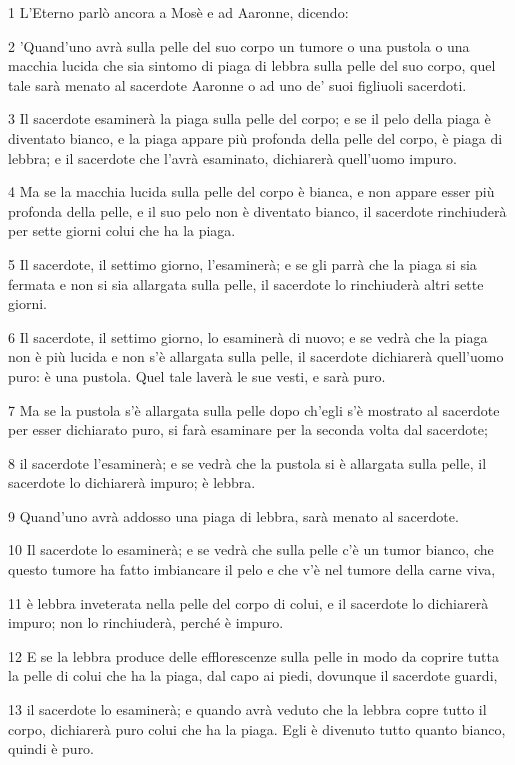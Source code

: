 \par 1 L'Eterno parlò ancora a Mosè e ad Aaronne, dicendo:
\par 2 'Quand'uno avrà sulla pelle del suo corpo un tumore o una pustola o una macchia lucida che sia sintomo di piaga di lebbra sulla pelle del suo corpo, quel tale sarà menato al sacerdote Aaronne o ad uno de' suoi figliuoli sacerdoti.
\par 3 Il sacerdote esaminerà la piaga sulla pelle del corpo; e se il pelo della piaga è diventato bianco, e la piaga appare più profonda della pelle del corpo, è piaga di lebbra; e il sacerdote che l'avrà esaminato, dichiarerà quell'uomo impuro.
\par 4 Ma se la macchia lucida sulla pelle del corpo è bianca, e non appare esser più profonda della pelle, e il suo pelo non è diventato bianco, il sacerdote rinchiuderà per sette giorni colui che ha la piaga.
\par 5 Il sacerdote, il settimo giorno, l'esaminerà; e se gli parrà che la piaga si sia fermata e non si sia allargata sulla pelle, il sacerdote lo rinchiuderà altri sette giorni.
\par 6 Il sacerdote, il settimo giorno, lo esaminerà di nuovo; e se vedrà che la piaga non è più lucida e non s'è allargata sulla pelle, il sacerdote dichiarerà quell'uomo puro: è una pustola. Quel tale laverà le sue vesti, e sarà puro.
\par 7 Ma se la pustola s'è allargata sulla pelle dopo ch'egli s'è mostrato al sacerdote per esser dichiarato puro, si farà esaminare per la seconda volta dal sacerdote;
\par 8 il sacerdote l'esaminerà; e se vedrà che la pustola si è allargata sulla pelle, il sacerdote lo dichiarerà impuro; è lebbra.
\par 9 Quand'uno avrà addosso una piaga di lebbra, sarà menato al sacerdote.
\par 10 Il sacerdote lo esaminerà; e se vedrà che sulla pelle c'è un tumor bianco, che questo tumore ha fatto imbiancare il pelo e che v'è nel tumore della carne viva,
\par 11 è lebbra inveterata nella pelle del corpo di colui, e il sacerdote lo dichiarerà impuro; non lo rinchiuderà, perché è impuro.
\par 12 E se la lebbra produce delle efflorescenze sulla pelle in modo da coprire tutta la pelle di colui che ha la piaga, dal capo ai piedi, dovunque il sacerdote guardi,
\par 13 il sacerdote lo esaminerà; e quando avrà veduto che la lebbra copre tutto il corpo, dichiarerà puro colui che ha la piaga. Egli è divenuto tutto quanto bianco, quindi è puro.

